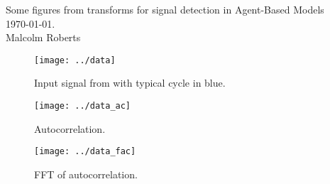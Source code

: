 \documentclass[a4paper]{article}
\newcommand{\thetitle}{Some figures from transforms for signal
  detection in Agent-Based Models}
\newcommand{\theauthor}{Malcolm Roberts}
\begin{document}
\begin{center}
  \thetitle{}\\
  \today.\\
  \theauthor{}
\end{center}







\begin{figure}[htbp]
  \begin{center}        
    \texttt{[image: ../data]}
    \caption{Input signal from \texttt{\filename} with typical cycle
      in blue.}
  \end{center}
\end{figure}

\begin{figure}[htbp]
  \begin{center}        
    \texttt{[image: ../data\_ac]}
    \caption{Autocorrelation.}
  \end{center}
\end{figure}

\begin{figure}[htbp]
  \begin{center}
    \texttt{[image: ../data\_fac]}
    \caption{FFT of autocorrelation.}
  \end{center}
\end{figure}
\end{document}
